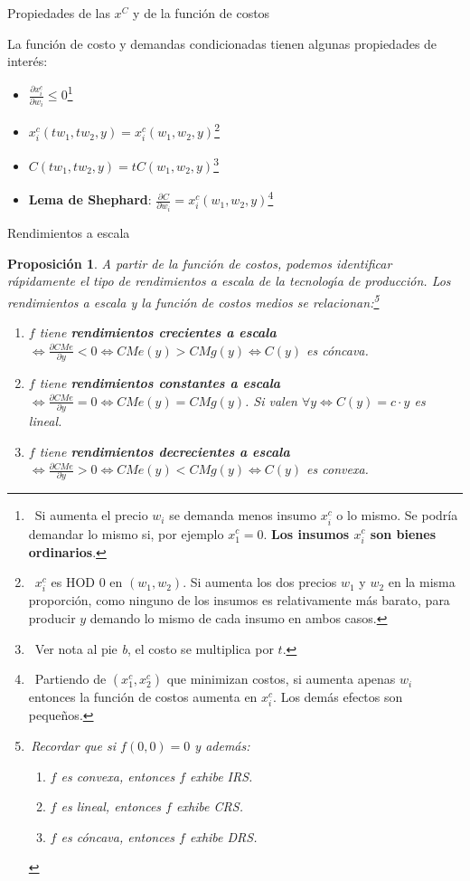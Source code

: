 \documentclass{beamer}
\newtheorem{prop}[thm]{Proposici\'on}
\theoremstyle{definition}
\begin{document}
\begin{frame}{Propiedades de las $x^C$ y de la función de costos }

La funci\'on de costo y demandas condicionadas tienen algunas propiedades de
inter\'es:
\begin{itemize}
	\item $\frac{\partial x^{c}_{i}}{\partial w_{i}}\leq 0$\footnote{ \, Si aumenta el precio $w_i$ se demanda menos insumo $x_i^c$ o lo mismo. Se podría demandar lo mismo si, por ejemplo $x_1^c=0$. \textbf{Los insumos $x_i^c$ son bienes ordinarios}.}
	\item $x^{c}_{i}(tw_{1},tw_{2},y)=x^{c}_{i}(w_{1},w_{2},y)$\footnote{\, $x_i^c$ es HOD 0 en $(w_1,w_2)$. Si aumenta los dos precios $w_1$ y $w_2$ en la misma proporción, como ninguno de los insumos es relativamente más barato, para producir $y$ demando lo mismo de cada insumo en ambos casos.} 
	\item $C(tw_{1},tw_{2},y)=tC(w_{1},w_{2},y)$\footnote{ \, Ver nota al pie \textit{b}, el costo se multiplica por $t$.}
	\item \textbf{Lema de Shephard}: $\frac{\partial C}{\partial w_{i}}=x^{c}_{i}(w_{1},w_{2},y)$\footnote{    \, Partiendo de $(x_1^c,x_2^c)$ que minimizan costos, si aumenta apenas $w_i$ entonces la función de costos aumenta en $x_i^c$. Los demás efectos son pequeños. }
	\end{itemize}
	
\end{frame}

\begin{frame}{Rendimientos a escala}

\begin{prop}
A partir de la funci\'{o}n de costos, podemos identificar r\'{a}pidamente el
tipo de rendimientos a escala de la tecnolog\'{\i}a de producci\'{o}n. Los rendimientos a escala y la funci\'{o}n de costos medios se relacionan:\footnote{\,Recordar que si $f(0,0)=0$ y además:
\begin{enumerate}
\item $f$ es convexa, entonces $f$ exhibe IRS.
\item $f$ es lineal, entonces $f$ exhibe CRS.
\item $f$ es cóncava, entonces $f$ exhibe DRS.
\end{enumerate}}
\begin{enumerate}
\item $f$ tiene \textbf{rendimientos crecientes a escala}  $\Leftrightarrow \frac{\partial
CMe}{\partial y}<0\Leftrightarrow CMe(y)>CMg(y) \Leftrightarrow C(y)$ es cóncava.
\item $f$ tiene \textbf{rendimientos constantes a escala} $\Leftrightarrow \frac{\partial
CMe}{\partial y}=0\Leftrightarrow CMe(y)=CMg(y)$. Si valen $\forall y \Leftrightarrow C(y)=c\cdot y$ es lineal.
\item $f$ tiene \textbf{rendimientos decrecientes a escala}  $\Leftrightarrow \frac{\partial
CMe}{\partial y}>0\Leftrightarrow CMe(y)<CMg(y) \Leftrightarrow C(y)$ es convexa.
\end{enumerate}
\end{prop}
\end{frame}
\end{document}
